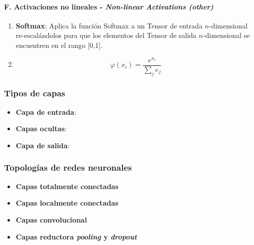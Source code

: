 \paragraph*{F. Activaciones no lineales - \textit{Non-linear Activations (other)} \cite{pytorch2024github}}

\begin{enumerate}
  \item \textbf{Softmax}: Aplica la función Softmax a un Tensor de entrada $n$-dimensional re-escalándolos para que los elementos del Tensor de salida $n$-dimensional se encuentren en el rango [0,1]. \cite{pytorch2024github}
  \item[] \begin{equation} \varphi(x_{i}) = \frac{e^{x_{i}}}{\sum_{j}{e_{j}}} \end{equation}
\end{enumerate}



\subsubsection{Tipos de capas}


\begin{itemize}
  \item \textbf{Capa de entrada}:
  \item \textbf{Capas ocultas}:
  \item \textbf{Capa de salida}:
\end{itemize}





\subsubsection{Topologías de redes neuronales}

\begin{itemize}
  \item \textbf{Capas totalmente conectadas}
  \item \textbf{Capas localmente conectadas}
  \item \textbf{Capas convolucional}
  \item \textbf{Capas reductora \textit{pooling} y \textit{dropout}}
\end{itemize}

